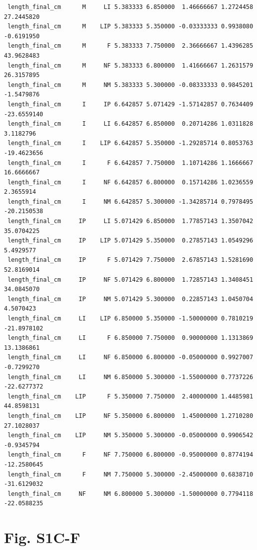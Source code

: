 \documentclass[
  landscape]{article}
\begin{document}
\begin{verbatim}
 length_final_cm      M     LI 5.383333 6.850000  1.46666667 1.2724458  27.2445820
 length_final_cm      M    LIP 5.383333 5.350000 -0.03333333 0.9938080  -0.6191950
 length_final_cm      M      F 5.383333 7.750000  2.36666667 1.4396285  43.9628483
 length_final_cm      M     NF 5.383333 6.800000  1.41666667 1.2631579  26.3157895
 length_final_cm      M     NM 5.383333 5.300000 -0.08333333 0.9845201  -1.5479876
 length_final_cm      I     IP 6.642857 5.071429 -1.57142857 0.7634409 -23.6559140
 length_final_cm      I     LI 6.642857 6.850000  0.20714286 1.0311828   3.1182796
 length_final_cm      I    LIP 6.642857 5.350000 -1.29285714 0.8053763 -19.4623656
 length_final_cm      I      F 6.642857 7.750000  1.10714286 1.1666667  16.6666667
 length_final_cm      I     NF 6.642857 6.800000  0.15714286 1.0236559   2.3655914
 length_final_cm      I     NM 6.642857 5.300000 -1.34285714 0.7978495 -20.2150538
 length_final_cm     IP     LI 5.071429 6.850000  1.77857143 1.3507042  35.0704225
 length_final_cm     IP    LIP 5.071429 5.350000  0.27857143 1.0549296   5.4929577
 length_final_cm     IP      F 5.071429 7.750000  2.67857143 1.5281690  52.8169014
 length_final_cm     IP     NF 5.071429 6.800000  1.72857143 1.3408451  34.0845070
 length_final_cm     IP     NM 5.071429 5.300000  0.22857143 1.0450704   4.5070423
 length_final_cm     LI    LIP 6.850000 5.350000 -1.50000000 0.7810219 -21.8978102
 length_final_cm     LI      F 6.850000 7.750000  0.90000000 1.1313869  13.1386861
 length_final_cm     LI     NF 6.850000 6.800000 -0.05000000 0.9927007  -0.7299270
 length_final_cm     LI     NM 6.850000 5.300000 -1.55000000 0.7737226 -22.6277372
 length_final_cm    LIP      F 5.350000 7.750000  2.40000000 1.4485981  44.8598131
 length_final_cm    LIP     NF 5.350000 6.800000  1.45000000 1.2710280  27.1028037
 length_final_cm    LIP     NM 5.350000 5.300000 -0.05000000 0.9906542  -0.9345794
 length_final_cm      F     NF 7.750000 6.800000 -0.95000000 0.8774194 -12.2580645
 length_final_cm      F     NM 7.750000 5.300000 -2.45000000 0.6838710 -31.6129032
 length_final_cm     NF     NM 6.800000 5.300000 -1.50000000 0.7794118 -22.0588235
\end{verbatim}

\section{Fig. S1C-F}\label{fig.-s1c-f}
\end{document}
